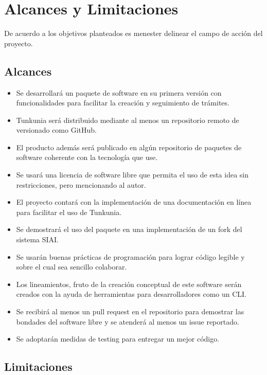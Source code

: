 \section{Alcances y Limitaciones}

De acuerdo a los objetivos planteados es menester delinear el campo de acción del proyecto.

\subsection{Alcances}

\begin{itemize}
    \item Se desarrollará un paquete de software en su primera versión con funcionalidades para facilitar la creación y seguimiento de trámites.
    \item Tunkunia será distribuido mediante al menos un repositorio remoto de versionado como GitHub.
    \item El producto además será publicado en algún repositorio de paquetes de software coherente con la tecnología que use.
    \item Se usará una licencia de software libre que permita el uso de esta idea sin restricciones, pero mencionando al autor.
    \item El proyecto contará con la implementación de una documentación en línea para facilitar el uso de Tunkunia.
    \item Se demostrará el uso del paquete en una implementación de un fork del sistema SIAI.
    \item Se usarán buenas prácticas de programación para lograr código legible y sobre el cual sea sencillo colaborar.
    \item Los lineamientos, fruto de la creación conceptual de este software serán creados con la ayuda de herramientas para desarrolladores como un CLI.
    \item Se recibirá al menos un pull request en el repositorio para demostrar las bondades del software libre y se atenderá al menos un issue reportado.
    \item Se adoptarán medidas de testing para entregar un mejor código.
    
\end{itemize}

\subsection{Limitaciones}

